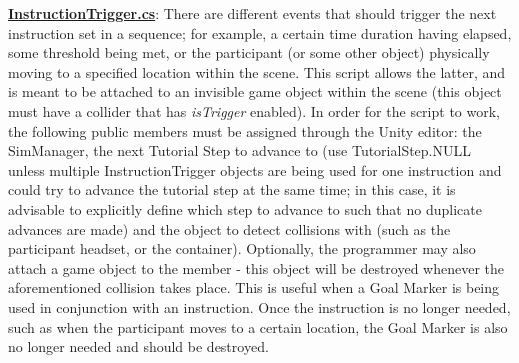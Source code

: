 \documentclass{article}
\begin{document}
\href{https://bit.ly/2uwAQ1u}{\textbf{InstructionTrigger.cs}}: There are different events that should trigger the next instruction set in a sequence; for example, a certain time duration having elapsed, some threshold being met, or the participant (or some other object) physically moving to a specified location within the scene. This script allows the latter, and is meant to be attached to an invisible game object within the scene (this object must have a collider that has \textit{isTrigger} enabled). In order for the script to work, the following public members must be assigned through the Unity editor: the SimManager, the next Tutorial Step to advance to (use TutorialStep.NULL unless multiple InstructionTrigger objects are being used for one instruction and could try to advance the tutorial step at the same time; in this case, it is advisable to explicitly define which step to advance to such that no duplicate advances are made) and the object to detect collisions with (such as the participant headset, or the container). Optionally, the programmer may also attach a game object to the  member - this object will be destroyed whenever the aforementioned collision takes place. This is useful when a Goal Marker is being used in conjunction with an instruction. Once the instruction is no longer needed, such as when the participant moves to a certain location, the Goal Marker is also no longer needed and should be destroyed. 
\end{document}
